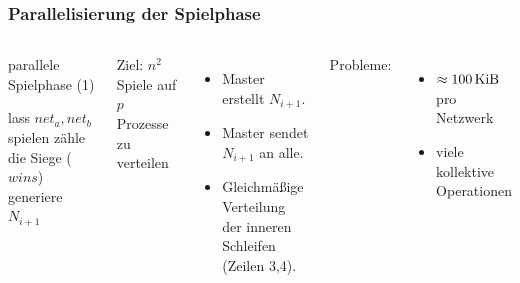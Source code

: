 \begin{frame}
    \frametitle{Parallelisierung der Spielphase}

    \begin{columns}[t]
        \vspace{-0.7cm}
        \begin{algorithm}[H]
            \caption{parallele Spielphase (1)}
            \begin{algorithmic}[1]
                            \State lass $net_a, net_b$ spielen
                            \State zähle die Siege ($wins$)
                        \EndParDo
                    \EndParDo
                    \State {}
                        generiere $N_{i+1}$
                    \EndIIf
                    \State {}
                \EndFor
            \end{algorithmic}
        \end{algorithm}
        \hfill

        Ziel: $n^2$ Spiele auf $p$ Prozesse zu verteilen
        \begin{itemize}
            \item Master erstellt $N_{i+1}$.
            \item Master sendet $N_{i+1}$ an alle.
            \item Gleichmäßige Verteilung der inneren Schleifen (Zeilen 3,4).
        \end{itemize}
        Probleme:
        \begin{itemize}
            \item $\approx \SI{100}{\kibi\byte}$ pro Netzwerk
            \item viele kollektive Operationen
        \end{itemize}
    \end{columns}
\end{frame}

